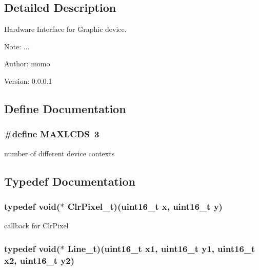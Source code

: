 \subsection{Detailed Description}
Hardware Interface for Graphic device. 

\begin{Desc}
\item[Note:]... \end{Desc}
\begin{Desc}
\item[Author:]momo \end{Desc}
\begin{Desc}
\item[Version:]0.0.0.1 \end{Desc}


\subsection{Define Documentation}
\hypertarget{group__graphic__hw__interface_g04bac763718080bfe54d5a7fa58036d2}{
\subsubsection[{MAXLCDS}]{\setlength{\rightskip}{0pt plus 5cm}\#define MAXLCDS~3}}
\label{group__graphic__hw__interface_g04bac763718080bfe54d5a7fa58036d2}


number of different device contexts 

\subsection{Typedef Documentation}
\hypertarget{group__graphic__hw__interface_g6840b9250f097bd4e0cc14ab0b607101}{
\subsubsection[{ClrPixel\_\-t}]{\setlength{\rightskip}{0pt plus 5cm}typedef void($\ast$ {\bf ClrPixel\_\-t})(uint16\_\-t x, uint16\_\-t y)}}
\label{group__graphic__hw__interface_g6840b9250f097bd4e0cc14ab0b607101}


callback for ClrPixel \hypertarget{group__graphic__hw__interface_g91ecaa7e16f781d972a8f96c4cd59492}{
\subsubsection[{Line\_\-t}]{\setlength{\rightskip}{0pt plus 5cm}typedef void($\ast$ {\bf Line\_\-t})(uint16\_\-t x1, uint16\_\-t y1, uint16\_\-t x2, uint16\_\-t y2)}}
\label{group__graphic__hw__interface_g91ecaa7e16f781d972a8f96c4cd59492}


